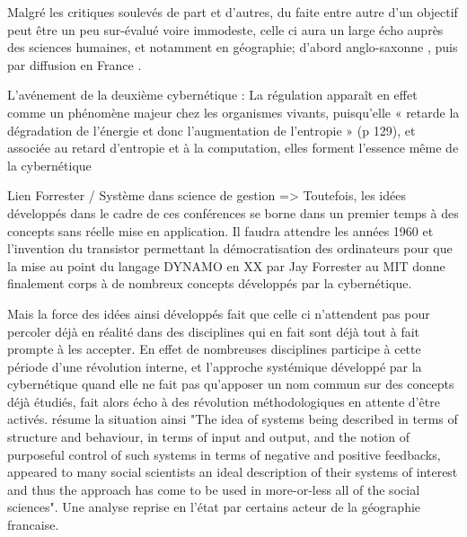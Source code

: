 Malgré les critiques soulevés de part et d'autres, du faite entre autre d'un objectif peut être un peu sur-évalué voire immodeste, celle ci aura un large écho auprès des sciences humaines, et notamment en géographie; d'abord anglo-saxonne \autocite{Haggett1965, Chorley1962}, puis par diffusion en France \autocite{Raymond}. 



L'avénement de la deuxième cybernétique : 
La régulation apparaît en effet comme un phénomène majeur chez les organismes vivants, puisqu’elle « retarde la dégradation de l’énergie et donc l’augmentation de l’entropie » (p 129), et associée au retard d’entropie et à la computation, elles forment l’essence même de la cybernétique



Lien Forrester / Système dans science de gestion => Toutefois, les idées développés dans le cadre de ces conférences se borne dans un premier temps à des concepts sans réelle mise en application. Il faudra attendre les années 1960 et l'invention du transistor permettant la démocratisation des ordinateurs pour que la mise au point du langage DYNAMO en XX par Jay Forrester au MIT donne finalement corps à de nombreux concepts développés par la cybernétique.

 Mais la force des idées ainsi développés fait que celle ci n'attendent pas pour percoler déjà en réalité dans des disciplines qui en fait sont déjà tout à fait prompte à les accepter. En effet de nombreuses disciplines participe à cette période d'une révolution interne, et l'approche systémique développé par la cybernétique quand elle ne fait pas qu'apposer un nom commun sur des concepts déjà étudiés, fait alors écho à des révolution méthodologiques en attente d'être activés. \autocite[5]{Batty1976} résume la situation ainsi "The idea of systems being described in terms of structure and behaviour, in terms of input and output, and the notion of purposeful control of such systems in terms of negative and positive feedbacks, appeared to many social scientists an ideal description of their systems of interest and thus the approach has come to be used in more-or-less all of the social sciences". 
Une analyse reprise en l'état par certains acteur de la géographie francaise.

